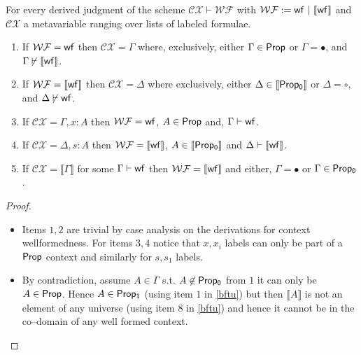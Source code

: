 \begin{proposition} 
\label{bfcw}
For every derived  judgment of the scheme $\mathcal{ CX}\vdash\mathcal{ WF}$ with $\mathcal{WF}:= {\sf wf}\  |\  {\sf \llbracket  wf \rrbracket }$ and $\mathcal{ CX}$ a metavariable ranging over lists of labeled formulae.
\begin{enumerate}
\item If $ \mathcal{ WF}= {\sf wf}$ then $\mathcal{CX}=\Gamma$ where, exclusively, either $\Gamma\in {\sf Prop}$ or $\Gamma=\bullet$, and $\Gamma\centernot\vdash \llbracket {\sf wf}\rrbracket$.
\item If $ \mathcal{ WF}= {\sf\llbracket wf\rrbracket}$ then $\mathcal{CX}=\Delta$ where exclusively, either $\Delta\in {\sf \llbracket Prop_0\rrbracket}$ or $\Delta = \circ$,  and $\Delta\centernot\vdash {\sf wf}$.
\item If $\mathcal{CX}= \Gamma, x:A$ then $ \mathcal{ WF}= {\sf wf}$, $A\in {\sf Prop}$ and,  $\Gamma\vdash {\sf wf}$.
\item If $\mathcal{CX}= \Delta, s:A $ then $ \mathcal{ WF}= { \llbracket {\sf wf} \rrbracket}$, $A\in { \llbracket {\sf Prop_0}\rrbracket}$  and $\Delta\vdash{ \llbracket {\sf wf}\rrbracket}$.
\item If $\mathcal{CX}=\llbracket \Gamma \rrbracket$ for some $\Gamma\vdash{\sf wf}$ then  $\mathcal{ WF}={\llbracket {\sf wf}\rrbracket}$ and either, $\Gamma = \bullet$ or $\Gamma \in {\sf Prop_0}$.
\end{enumerate}
\end{proposition}
\begin{proof}
\begin{itemize}

\item
Items $1,2$ are trivial by case analysis on the derivations for context wellformedness. For items $3,4$ notice that $x,x_i$ labels can only be part of a ${\sf Prop}$ context and similarly for $s,s_1$ labels.
\item
By contradiction, assume $A\in\Gamma$ s.t. $A\not\in {\sf Prop_0}$ from $1$ it can only be $A\in {\sf Prop}$.
Hence $A\in {\sf Prop_1}$ (using item $1$ in \ref{bftu}) but then $\llbracket A \rrbracket$ is not an element of any universe (using item $8$ in \ref{bftu}) and hence it cannot be in the co--domain of any well formed context.
\end{itemize}
\end{proof}

